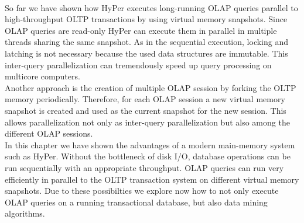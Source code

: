 \\
So far we have shown how HyPer executes long-running OLAP queries parallel to high-throughput OLTP transactions by using virtual memory snapshots. Since OLAP queries are read-only HyPer can execute them in parallel in multiple threads sharing the same snapshot. As in the sequential execution, locking and latching is not necessary because the used data structures are immutable. This inter-query parallelization can tremendously speed up query processing on multicore computers.
\\
Another approach is the creation of multiple OLAP session by forking the OLTP memory periodically. Therefore, for each OLAP session a new virtual memory snapshot is created and used as the current snapshot for the new session. This allows parallelization not only as inter-query parallelization but also among the different OLAP sessions.
\\ 
In this chapter we have shown the advantages of a modern main-memory system such as HyPer. Without the bottleneck of disk I/O, database operations can be run sequentially with an appropriate throughput. OLAP queries can run very efficiently in parallel to the OLTP transaction system on different virtual memory snapshots. Due to these possibilties we explore now how to not only execute OLAP queries on a running transactional database, but also data mining algorithms.


